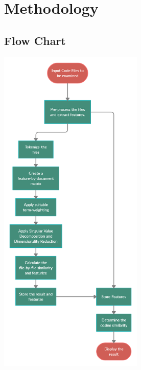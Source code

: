 \documentclass[12pt]{article}
\begin{document}

\section{Methodology}
\subsection{Flow Chart}
\includegraphics[height=16cm]{flow.png}
\pagebreak
\end{document}
